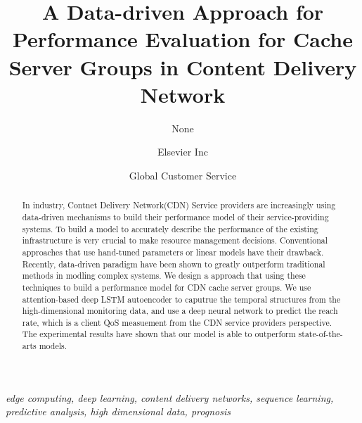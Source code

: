 \documentclass[5p]{elsarticle}
\newcommand{\dabiaolv}{reach rate}
\begin{document}
\begin{frontmatter}

\title{A Data-driven Approach for Performance Evaluation for Cache Server Groups in Content Delivery Network
    }

\author{None
    }
\address{Radarweg 29, Amsterdam}

\author[mymainaddress,mysecondaryaddress]{Elsevier Inc}

\author[mysecondaryaddress]{Global Customer Service}

\address[mymainaddress]{1600 John F Kennedy Boulevard, Philadelphia}
\address[mysecondaryaddress]{360 Park Avenue South, New York}

\begin{abstract}
In industry, Contnet Delivery Network(CDN) Service providers are increasingly using data-driven mechanisms to build their performance model of their service-providing systems. To build a model to accurately describe the performance of the existing infrastructure is very crucial to make resource management decisions. Conventional approaches that use hand-tuned parameters or linear models have their drawback. Recently, data-driven paradigm have been shown to greatly outperform traditional methods in modling complex systems. We design a approach that using these techniques to build a performance model for CDN cache server groups. We use attention-based deep LSTM autoencoder to caputrue the temporal structures from the high-dimensional monitoring data, and use a deep neural network to predict the \dabiaolv, which is a client QoS measuement from the CDN service providers perspective. The experimental results have shown that our model is able to outperform state-of-the-arts models.
\end{abstract}
\begin{keyword}
\textit{edge computing, deep learning, content delivery networks, sequence learning, predictive analysis, high dimensional data, prognosis}
\end{keyword}
\end{frontmatter}
\linenumbers
\end{document}
